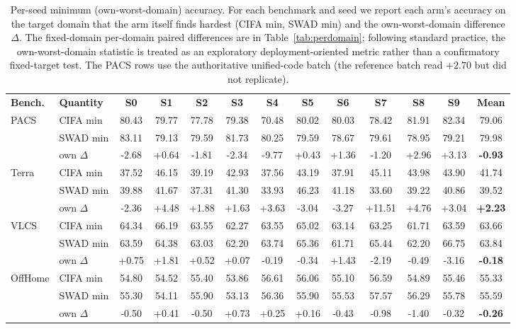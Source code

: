 \documentclass[electronics,article,submit,moreauthors]{Definitions/mdpi}
\newcommand{\add}[1]{\textcolor{addblue}{#1}}
\def\add#1{#1}%
\renewcommand{\add}[1]{#1}
\begin{document}
\begin{table}[H]
\caption{Per-seed minimum (own-worst-domain) accuracy. For each benchmark and seed we report each arm's accuracy on the target domain that the arm itself finds hardest (CIFA min, SWAD min) and the own-worst-domain difference $\Delta$. The fixed-domain per-domain paired differences are in Table~\ref{tab:perdomain}; following standard practice, the own-worst-domain statistic is treated as an exploratory deployment-oriented metric rather than a confirmatory fixed-target test. \add{The PACS rows use the authoritative unified-code batch (the reference batch read $+2.70$ but did not replicate).}}
\label{tab:worst}
\setlength{\tabcolsep}{3.4pt}
\footnotesize
\begin{tabular}{llccccccccccc}
\toprule
\textbf{Bench.} & \textbf{Quantity} & \textbf{S0} & \textbf{S1} & \textbf{S2} & \textbf{S3} & \textbf{S4} & \textbf{S5} & \textbf{S6} & \textbf{S7} & \textbf{S8} & \textbf{S9} & \textbf{Mean}\\
PACS & CIFA min & 80.43 & 79.77 & 77.78 & 79.38 & 70.48 & 80.02 & 80.03 & 78.42 & 81.91 & 82.34 & 79.06 \\
 & SWAD min & 83.11 & 79.13 & 79.59 & 81.73 & 80.25 & 79.59 & 78.67 & 79.61 & 78.95 & 79.21 & 79.98 \\
 & own $\Delta$ & -2.68 & +0.64 & -1.81 & -2.34 & -9.77 & +0.43 & +1.36 & -1.20 & +2.96 & +3.13 & \textbf{-0.93} \\
\midrule
Terra & CIFA min & 37.52 & 46.15 & 39.19 & 42.93 & 37.56 & 43.19 & 37.91 & 45.11 & 43.98 & 43.90 & 41.74 \\
 & SWAD min & 39.88 & 41.67 & 37.31 & 41.30 & 33.93 & 46.23 & 41.18 & 33.60 & 39.22 & 40.86 & 39.52 \\
 & own $\Delta$ & -2.36 & +4.48 & +1.88 & +1.63 & +3.63 & -3.04 & -3.27 & +11.51 & +4.76 & +3.04 & \textbf{+2.23} \\
\midrule
VLCS & CIFA min & 64.34 & 66.19 & 63.55 & 62.27 & 63.55 & 65.02 & 63.14 & 63.25 & 61.71 & 63.59 & 63.66 \\
 & SWAD min & 63.59 & 64.38 & 63.03 & 62.20 & 63.74 & 65.36 & 61.71 & 65.44 & 62.20 & 66.75 & 63.84 \\
 & own $\Delta$ & +0.75 & +1.81 & +0.52 & +0.07 & -0.19 & -0.34 & +1.43 & -2.19 & -0.49 & -3.16 & \textbf{-0.18} \\
\midrule
OffHome & CIFA min & 54.80 & 54.52 & 55.40 & 53.86 & 56.61 & 56.06 & 55.10 & 56.59 & 54.89 & 55.46 & 55.33 \\
 & SWAD min & 55.30 & 54.11 & 55.90 & 53.13 & 56.36 & 55.90 & 55.53 & 57.57 & 56.29 & 55.78 & 55.59 \\
 & own $\Delta$ & -0.50 & +0.41 & -0.50 & +0.73 & +0.25 & +0.16 & -0.43 & -0.98 & -1.40 & -0.32 & \textbf{-0.26} \\
\bottomrule
\end{tabular}
\end{table}
\end{document}
